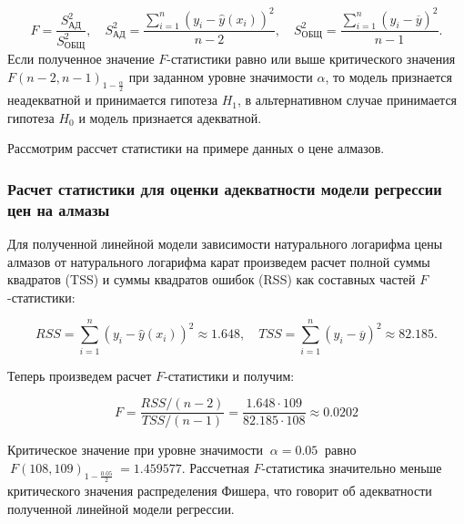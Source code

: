\documentclass[
]{article}
\begin{document}
\[
F = \frac{S^2_{\text{АД}}}{S^2_{\text{ОБЩ}}}, \quad S^2_{\text{АД}} = \frac{\sum\limits_{i=1}^{n} \left(  y_i - \hat{y}(x_i)\right)^2}{n-2}, \quad S^2_{\text{ОБЩ}} = \frac{\sum \limits_{i=1}^{n}\left(  y_i - \overline{y}\right)^2}{n - 1}.
\] Если полученное значение \(F\)-статистики равно или выше критического
значения \(F(n-2, n-1)_{1 - \frac{\alpha}{2}}\) при заданном уровне
значимости \(\alpha\), то модель признается неадекватной и принимается
гипотеза \(H_1\), в альтернативном случае принимается гипотеза \(H_0\) и
модель признается адекватной.

Рассмотрим рассчет статистики на примере данных о цене алмазов.

\hypertarget{ux440ux430ux441ux447ux435ux442-ux441ux442ux430ux442ux438ux441ux442ux438ux43aux438-ux434ux43bux44f-ux43eux446ux435ux43dux43aux438-ux430ux434ux435ux43aux432ux430ux442ux43dux43eux441ux442ux438-ux43cux43eux434ux435ux43bux438-ux440ux435ux433ux440ux435ux441ux441ux438ux438-ux446ux435ux43d-ux43dux430-ux430ux43bux43cux430ux437ux44b}{%
\subsubsection{\texorpdfstring{\textbf{Расчет статистики для оценки
адекватности модели регрессии цен на
алмазы}}{Расчет статистики для оценки адекватности модели регрессии цен на алмазы}}\label{ux440ux430ux441ux447ux435ux442-ux441ux442ux430ux442ux438ux441ux442ux438ux43aux438-ux434ux43bux44f-ux43eux446ux435ux43dux43aux438-ux430ux434ux435ux43aux432ux430ux442ux43dux43eux441ux442ux438-ux43cux43eux434ux435ux43bux438-ux440ux435ux433ux440ux435ux441ux441ux438ux438-ux446ux435ux43d-ux43dux430-ux430ux43bux43cux430ux437ux44b}}

Для полученной линейной модели зависимости натурального логарифма цены
алмазов от натурального логарифма карат произведем расчет полной суммы
квадратов (TSS) и суммы квадратов ошибок (RSS) как составных частей
\(F\)-статистики:

\[
RSS = \sum \limits_{i=1}^{n}(y_i - \hat{y}(x_i))^2 \approx 1.648, \quad TSS = \sum\limits_{i=1}^{n}(y_i - \overline{y})^2 \approx 82.185.
\]

Теперь произведем расчет \(F\)-статистики и получим:

\[
F = \frac{RSS / (n - 2)}{TSS / (n-1)} = \frac{1.648 \cdot 109}{82.185 \cdot 108} \approx 0.0202
\]

Критическое значение при уровне значимости \(\ \alpha = 0.05\ \) равно
\(\ F(108, 109)_{1 - \frac{0.05}{2}}\  = 1.459577\). Рассчетная
\(F\)-статистика значительно меньше критического значения распределения
Фишера, что говорит об адекватности полученной линейной модели
регрессии.
\end{document}
